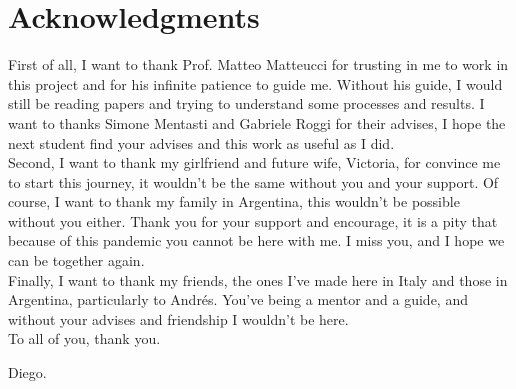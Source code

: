 
\bigskip

\begingroup
\let\clearpage\relax
\let\cleardoublepage\relax
\let\cleardoublepage\relax
\chapter*{Acknowledgments}

First of all, I want to thank Prof. Matteo Matteucci for trusting in me to work in this project and for his infinite patience to guide me. Without his guide, I would still be reading papers and trying to understand some processes and results. I want to thanks Simone Mentasti and Gabriele Roggi for their advises, I hope the next student find your advises and this work as useful as I did.\\

Second, I want to thank my girlfriend and future wife, Victoria, for convince me to start this journey, it wouldn't be the same without you and your support. Of course, I want to thank my family in Argentina, this wouldn't be possible without you either. Thank you for your support and encourage, it is a pity that because of this pandemic you cannot be here with me. I miss you, and I hope we can be together again.\\

Finally, I want to thank my friends, the ones I've made here in Italy and those in Argentina, particularly to Andrés. You've being a mentor and a guide, and without your advises and friendship I wouldn't be here. \\

To all of you, thank you.

\begin{flushright}
Diego.
\end{flushright}

\endgroup